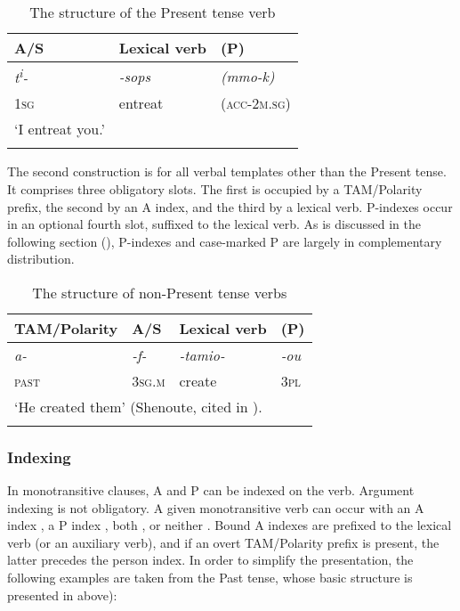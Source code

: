 \documentclass[output=paper]{LSP/langsci}
\begin{document}
\begin{table}
\begin{tabular}{lll}
\lsptoprule
A/S & Lexical verb & (P)\\
\midrule
\textit{t}\textit{\textsuperscript{i}}\textit{-} & \textit{-sops} & \textit{(mmo-k)}\\
\textsc{1sg} & entreat & \textsc{(acc-2m.sg)}\\
‘I entreat you.’ & & \\
\lspbottomrule
\end{tabular}
\caption{The structure of the Present tense verb}\label{05-gr-tab:2}
\end{table}


The second construction is for all verbal templates other than the Present tense. It comprises three obligatory slots. The first is occupied by a TAM/Polarity prefix, the second by an A index, and the third by a lexical verb. P-indexes occur in an optional fourth slot, suffixed to the lexical verb. As is discussed in the following section (), P-indexes and case-marked P are largely in complementary distribution.

\begin{table}
\begin{tabular}{llll}
\lsptoprule
TAM/Polarity & A/S & Lexical verb & (P)\\\midrule
\textit{a-} & \textit{-f-} & \textit{-tamio-} & \textit{-ou}\\
\textsc{past} & \textsc{3sg.m} & create & \textsc{3pl}\\
\multicolumn{4}{l}{‘He created them’ (Shenoute, cited in \citealt[34]{Shisha-Halevy1988Coptic}).}\\
\lspbottomrule
\end{tabular}
\caption{The structure of non-Present tense verbs}\label{05-gr-tab:3}
\end{table}

\subsubsection{Indexing} \label{05-sec:3-2-1}

In monotransitive clauses, A and P can be indexed on the verb. Argument indexing is not obligatory. A given monotransitive verb can occur with an A index , a P index , both , or neither . 
Bound A indexes are prefixed to the lexical verb (or an auxiliary verb), and if an overt TAM/Polarity prefix is present, the latter precedes the person index. 
In order to simplify the presentation, the following examples are taken from the Past tense, whose basic structure is presented in  above):
\end{document}
